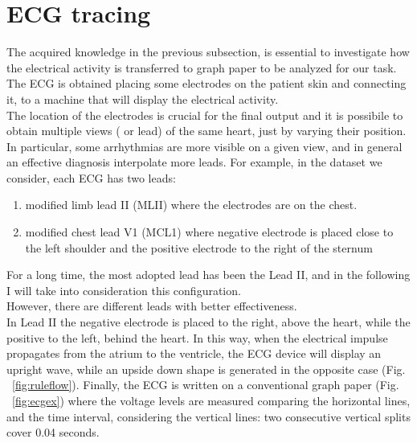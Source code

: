 \documentclass[LaM,binding=0.6cm]{sapthesis}
\begin{document}
\section{ECG tracing}
The acquired knowledge in the previous subsection, is essential to investigate how the electrical activity is transferred to graph paper to be analyzed for our task.\\The ECG is obtained placing some electrodes on the patient skin and connecting it, to a machine that will display the electrical activity.\\The location of the electrodes is crucial for the final output and it is possibile to obtain multiple views ( or lead) of the same heart, just by varying their position.\\In particular, some arrhythmias are more visible on a given view, and in general an effective diagnosis interpolate more leads. For example, in the dataset we consider, each ECG has two leads:
\begin{enumerate}
\item modified limb lead II (MLII) where the electrodes are on the chest.
\item modified chest lead V1 (MCL1) where negative electrode is placed close to the left shoulder and the positive electrode to the right of the sternum 
\end{enumerate}
For a long time, the most adopted lead has been the Lead II, and in the following I will take into consideration this configuration.\\However, there are different leads with better effectiveness.\\In Lead II the negative electrode is placed to the right, above the heart, while the positive to the left, behind the heart. In this way, when the electrical impulse propagates from the atrium to the ventricle, the ECG device will display an upright wave, while an upside down shape is generated in the opposite case (Fig. ~\ref{fig:ruleflow}).
Finally, the ECG is written on a conventional graph paper (Fig. ~\ref{fig:ecgex}) where the voltage levels are measured comparing the horizontal lines, and the time interval, considering the vertical lines: two consecutive vertical splits cover 0.04 seconds.
\end{document}
